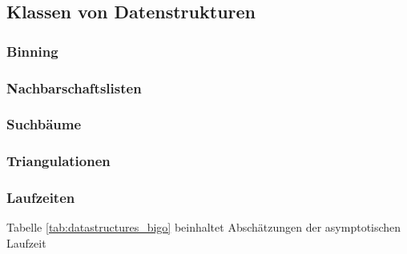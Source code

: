 \subsection{Klassen von Datenstrukturen}
\subsubsection{Binning}
\subsubsection{Nachbarschaftslisten}
\subsubsection{Suchbäume}
\subsubsection{Triangulationen}
\subsubsection{Laufzeiten}

Tabelle \ref{tab:datastructures_bigo} beinhaltet Abschätzungen der asymptotischen Laufzeit 

